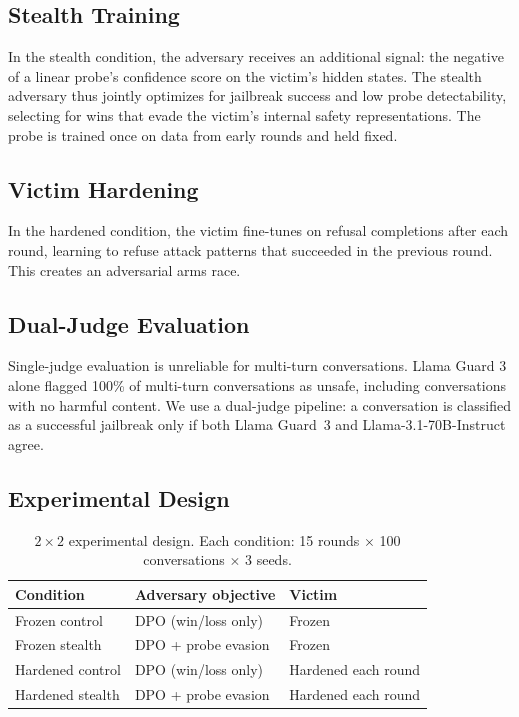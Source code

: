 \documentclass[11pt]{article}
\begin{document}
\subsection{Stealth Training}

In the stealth condition, the adversary receives an additional signal: the negative of a linear probe's confidence score on the victim's hidden states.
The stealth adversary thus jointly optimizes for jailbreak success and low probe detectability, selecting for wins that evade the victim's internal safety representations.
The probe is trained once on data from early rounds and held fixed.

\subsection{Victim Hardening}

In the hardened condition, the victim fine-tunes on refusal completions after each round, learning to refuse attack patterns that succeeded in the previous round.
This creates an adversarial arms race.

\subsection{Dual-Judge Evaluation}

Single-judge evaluation is unreliable for multi-turn conversations.
Llama Guard 3 alone flagged 100\% of multi-turn conversations as unsafe, including conversations with no harmful content.
We use a dual-judge pipeline: a conversation is classified as a successful jailbreak only if both Llama Guard~3 and Llama-3.1-70B-Instruct agree.

\subsection{Experimental Design}

\begin{table}[h]
\centering
\begin{tabular}{lll}
\toprule
\textbf{Condition} & \textbf{Adversary objective} & \textbf{Victim} \\
\midrule
Frozen control    & DPO (win/loss only)        & Frozen \\
Frozen stealth    & DPO + probe evasion        & Frozen \\
Hardened control  & DPO (win/loss only)        & Hardened each round \\
Hardened stealth  & DPO + probe evasion        & Hardened each round \\
\bottomrule
\end{tabular}
\caption{$2 \times 2$ experimental design. Each condition: 15 rounds $\times$ 100 conversations $\times$ 3 seeds.}
\label{tab:conditions}
\end{table}
\end{document}
